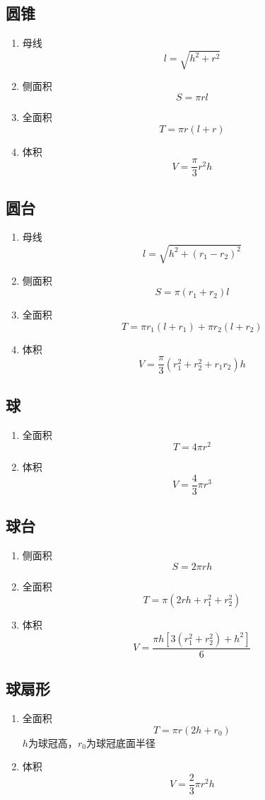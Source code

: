\subsection{圆锥}
	\begin{enumerate}
		\item 母线
			$$l=\sqrt{h^2+r^2}$$
		\item 侧面积
			$$S=\pi rl$$
		\item 全面积
			$$T=\pi r(l+r)$$
		\item 体积
			$$V=\frac{\pi}{3} r^2h$$
	\end{enumerate}
\subsection{圆台}
	\begin{enumerate}
		\item 母线
			$$l=\sqrt{h^2+(r_1-r_2)^2}$$
		\item 侧面积
			$$S=\pi(r_1+r_2)l$$
		\item 全面积
			$$T=\pi r_1(l+r_1)+\pi r_2(l+r_2)$$
		\item 体积
			$$V=\frac{\pi}{3}(r_1^2+r_2^2+r_1r_2)h$$
	\end{enumerate}
\subsection{球}
	\begin{enumerate}
		\item 全面积
			$$T=4\pi r^2$$
		\item 体积
			$$V=\frac{4}{3}\pi r^3$$
	\end{enumerate}
\subsection{球台}
	\begin{enumerate}
		\item 侧面积
			$$S=2\pi rh$$
		\item 全面积
			$$T=\pi(2rh+r_1^2+r_2^2)$$
		\item 体积
			$$V=\frac{\pi h[3(r_1^2+r_2^2)+h^2]}{6}$$
	\end{enumerate}
\subsection{球扇形}
	\begin{enumerate}
		\item 全面积
			$$T=\pi r(2h+r_0)$$
			$h$为球冠高，$r_0$为球冠底面半径
		\item 体积
			$$V=\frac{2}{3}\pi r^2h$$
	\end{enumerate}
